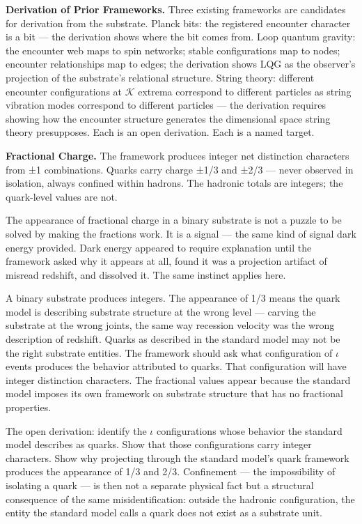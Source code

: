 \documentclass[11pt,letterpaper]{article}
\newcommand{\Kappa}{\mathcal{K}}
\begin{document}
\textbf{Derivation of Prior Frameworks.} Three existing frameworks are candidates for derivation from the substrate. Planck bits: the registered encounter character is a bit --- the derivation shows where the bit comes from. Loop quantum gravity: the encounter web maps to spin networks; stable configurations map to nodes; encounter relationships map to edges; the derivation shows LQG as the observer's projection of the substrate's relational structure. String theory: different encounter configurations at \(\Kappa\) extrema correspond to different particles as string vibration modes correspond to different particles --- the derivation requires showing how the encounter structure generates the dimensional space string theory presupposes. Each is an open derivation. Each is a named target.

\textbf{Fractional Charge.} The framework produces integer net distinction characters from ±1 combinations. Quarks carry charge ±1/3 and ±2/3 --- never observed in isolation, always confined within hadrons. The hadronic totals are integers; the quark-level values are not.

The appearance of fractional charge in a binary substrate is not a puzzle to be solved by making the fractions work. It is a signal --- the same kind of signal dark energy provided. Dark energy appeared to require explanation until the framework asked why it appears at all, found it was a projection artifact of misread redshift, and dissolved it. The same instinct applies here.

A binary substrate produces integers. The appearance of 1/3 means the quark model is describing substrate structure at the wrong level --- carving the substrate at the wrong joints, the same way recession velocity was the wrong description of redshift. Quarks as described in the standard model may not be the right substrate entities. The framework should ask what configuration of \(\iota\) events produces the behavior attributed to quarks. That configuration will have integer distinction characters. The fractional values appear because the standard model imposes its own framework on substrate structure that has no fractional properties.

The open derivation: identify the \(\iota\) configurations whose behavior the standard model describes as quarks. Show that those configurations carry integer characters. Show why projecting through the standard model's quark framework produces the appearance of 1/3 and 2/3. Confinement --- the impossibility of isolating a quark --- is then not a separate physical fact but a structural consequence of the same misidentification: outside the hadronic configuration, the entity the standard model calls a quark does not exist as a substrate unit.
\end{document}
